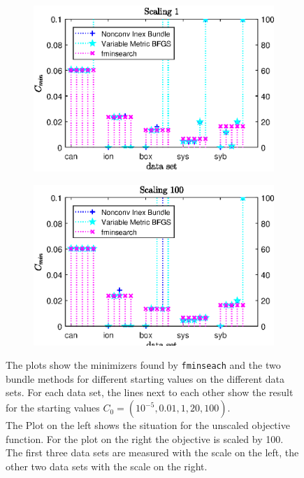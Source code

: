 \begin{figure}[ht]
	\begin{subfigure}{0.49\textwidth}
		\includegraphics[width=\textwidth]{Pictures/Plots/Scal1_ll-15C.eps}%
	\end{subfigure}
	\begin{subfigure}{0.49\textwidth}
		\includegraphics[width=\textwidth]{Pictures/Plots/Scal100_ll-15C.eps}%
	\end{subfigure}
	\caption[Minimizer for different starting values and scalings]{The plots show the minimizers found by \textup{\texttt{fminseach}} and the two bundle methods for different starting values on the different data sets. For each data set, the lines next to each other show the result for the starting values \(C_0 = (10^{-5},0.01,1,20,100)\).\\
	The Plot on the left shows the situation for the unscaled objective function. For the plot on the right the objective is scaled by 100.\\
	The first three data sets are measured with the scale on the left, the other two data sets with the scale on the right.}%
	\label{fig_ll15_sc1100_C}%
\end{figure}

